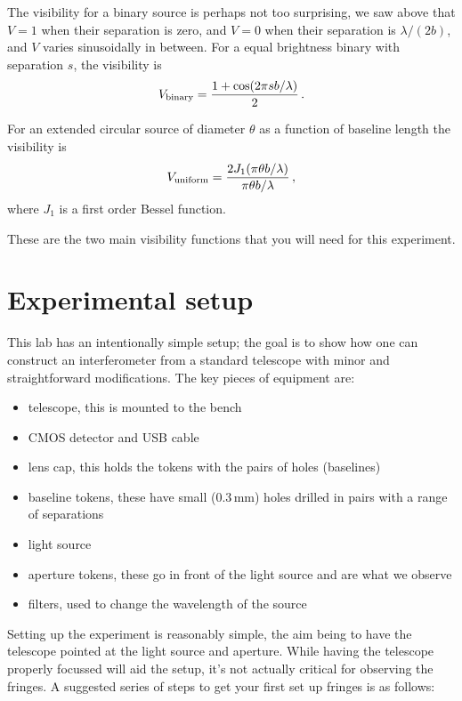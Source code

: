 \documentclass[11pt]{article}
\begin{document}
The visibility for a binary source is perhaps not too surprising, we saw above that $V=1$ when their separation is zero, and $V=0$ when their separation is $\lambda/(2b)$, and $V$ varies sinusoidally in between. For a equal brightness binary with separation $s$, the visibility is
\begin{equation}
    V_{\rm binary} = \frac{1 + \cos ( 2 \pi s b / \lambda )}{2} \, .
\end{equation}

For an extended circular source of diameter $\theta$ as a function of baseline length the visibility is
\begin{equation}
    V_{\rm uniform} = \frac{2 J_1(\pi \theta b / \lambda)}{\pi \theta b / \lambda} \, ,
\end{equation}
where $J_1$ is a first order Bessel function.

These are the two main visibility functions that you will need for this experiment.

\section{Experimental setup}

This lab has an intentionally simple setup; the goal is to show how one can construct an interferometer from a standard telescope with minor and straightforward modifications. The key pieces of equipment are:
\begin{itemize}
    \item telescope, this is mounted to the bench
    \item CMOS detector and USB cable
    \item lens cap, this holds the tokens with the pairs of holes (baselines)
    \item baseline tokens, these have small (0.3\,mm) holes drilled in pairs with a range of separations
    \item light source
    \item aperture tokens, these go in front of the light source and are what we observe
    \item filters, used to change the wavelength of the source
\end{itemize}

Setting up the experiment is reasonably simple, the aim being to have the telescope pointed at the light source and aperture. While having the telescope properly focussed will aid the setup, it's not actually critical for observing the fringes. A suggested series of steps to get your first set up fringes is as follows:
\end{document}
